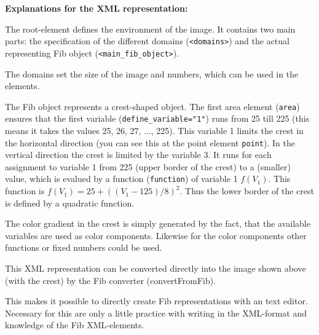 \documentclass[12pt,a4paper]{article}
\begin{document}
\bigskip\noindent
\textbf{Explanations for the XML representation:}

The root-element defines the environment of the image. It contains two main parts: the specification of the different domains (\verb|<domains>|) and the actual representing Fib object (\verb|<main_fib_object>|).

The domains set the size of the image and numbers, which can be used in the elements.

The Fib object represents a crest-shaped object.
The first area element (\verb|area|) ensures that the first variable (\verb|define_variable="1"|) runs from 25 till 225 (this means it takes the values 25, 26, 27, ..., 225). This variable 1 limits the crest in the horizontal direction (you can see this at the point element \verb|point|).
In the vertical direction the crest is limited by the variable 3. It runs for each assignment to variable 1 from 225 (upper border of the crest) to a (smaller) value, which is evalued by a function (\verb|function|) of variable 1 $f(V_1)$. This function is $f(V_1) = 25 + ((V_1 - 125) / 8)^{2} $. Thus the lower border of the crest is defined by a quadratic function.

The color gradient in the crest is simply generated by the fact, that the available variables are used as color components. Likewise for the color components other functions or fixed numbers could be used.

This XML representation can be converted directly into the image shown above (with the crest) by the Fib converter (convertFromFib).

This makes it possible to directly create Fib representations with an text editor. Necessary for this are only a little practice with writing in the XML-format and knowledge of the Fib XML-elements.
\end{document}
